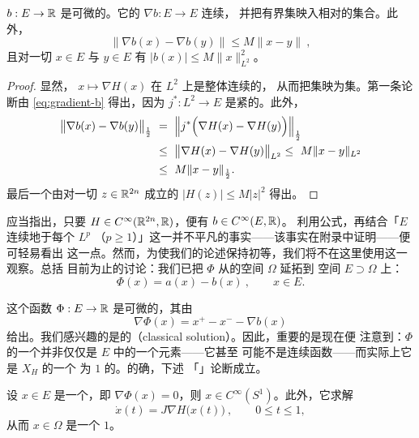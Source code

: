 \begin{lemma}\label{lem:gradient-b-compact}
\trMapping{} $b:E\to\mathbb{R}$ 是可微的。它的\trGradient{} $\nabla b:E\to E$ 连续，%
并把有界集映入相对\trCompact{}的集合。此外，
\[
\bigl\|\nabla b(x)-\nabla b(y)\bigr\|\leq M\|x-y\|\ ,
\]
且对一切 $x\in E$ 与 $y\in E$ 有 $|b(x)|\leq M\|x\|_{L^{2}}^{2}$。
\end{lemma}

\begin{proof}
显然，\trMapping{} $x\mapsto\nabla H(x)$ 在 $L^{2}$ 上是整体\trLipschitz{}连续的，%
从而把\trBounded{}集映为\trBounded{}集。第一条论断由 \eqref{eq:gradient-b} 得出，因为%
$j^{*}:L^{2}\to E$ 是紧的。此外，
\begin{align*}
\bigl\|\nabla b(x)-\nabla b(y)\bigr\|_{\frac{1}{2}}\ &=\ %
\Bigl\|j^{*}\Bigl(\nabla H(x)-\nabla H(y)\Bigr)\Bigr\|_{\frac{1}{2}}\\
&\leq\ \bigl\|\nabla H(x)-\nabla H(y)\bigr\|_{L^{2}}\leq\ %
M\|x-y\|_{L^{2}}\\
&\leq\ M\|x-y\|_{\frac{1}{2}}.
\end{align*}
最后一个\trEstimate{}由对一切 $z\in\mathbb{R}^{2n}$ 成立的 $|H(z)|\leq M|z|^{2}$ 得出。
\end{proof}

应当指出，只要 $H\in C^{\infty}(\mathbb{R}^{2n},\mathbb{R})$，便有 $b\in C^{\infty}(E,\mathbb{R})$。%
利用\trTaylor{}公式，再结合「$E$ 连续地\trEmbedding{}于每个 $L^{p}$%
（$p\geq1$）」这一并不平凡的事实——该事实在附录中证明——便可轻易看出%
这一点。然而，为使我们的论述保持初等，我们将不在这里使用这一观察。总括%
目前为止的讨论：我们已把 $\Phi$ 从\trSmooth{}\trLoop{}的空间 $\Omega$ 延拓到%
\trHilbert{}空间 $E\supset\Omega$ 上：
\[
\Phi(x)=a(x)-b(x)\ ,\qquad x\in E.
\]

这个函数 $\Phi:E\to\mathbb{R}$ 是可微的，其\trGradient{}由
\[
\nabla\Phi(x)=x^{+}-x^{-}-\nabla b(x)
\]
给出。我们感兴趣的是\trDifferentialEquation{}的\textbf{\trClassicalSolution}（classical solution）。因此，重要的是现在便%
注意到：$\Phi$ 的一个\trCriticalPoint{}并非仅仅是 $E$ 中的一个元素——它甚至%
可能不是连续函数——而实际上它是\trHamiltonianEquation{} $X_H$ 的一个%
\trPeriodic{}为 $1$ 的\trSmooth\trPeriodicSolution。的确，下述%
「\trRegularity」论断成立。

\begin{lemma}\label{lem:critical-point-regularity}
设 $x\in E$ 是一个\trCriticalPoint，即 $\nabla\Phi(x)=0$，则%
$x\in C^{\infty}(S^{1})$。此外，它求解\trHamiltonianEquation
\[
\dot{x}(t)=J\nabla H\bigl(x(t)\bigr)\ ,\qquad 0\leq t\leq1,
\]
从而 $x\in\Omega$ 是一个 $1$\trPeriodicSolution。
\end{lemma}

